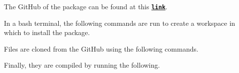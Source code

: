 The Git\+Hub of the package can be found at this \href{https://github.com/Francisco8382/bebop_controller}{\texttt{ {\bfseries{link}}}}.

In a bash terminal, the following commands are run to create a workspace in which to install the package.


\begin{DoxyCode}{0}

\end{DoxyCode}


Files are cloned from the Git\+Hub using the following commands.


\begin{DoxyCode}{0}

\end{DoxyCode}


Finally, they are compiled by running the following.


\begin{DoxyCode}{0}

\end{DoxyCode}
 